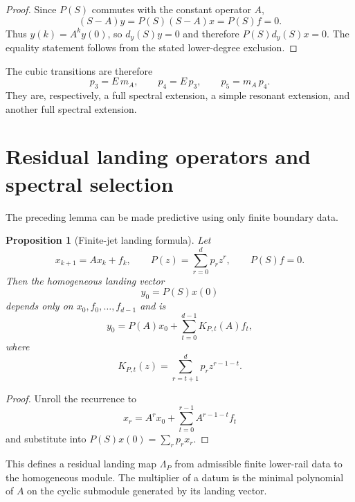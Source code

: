 \documentclass[11pt]{amsart}
\newtheorem{proposition}[theorem]{Proposition}
\begin{document}
\begin{proof}
Since $P(S)$ commutes with the constant operator $A$,
\[
(S-A)y=P(S)(S-A)x=P(S)f=0.
\]
Thus $y(k)=A^ky(0)$, so $d_y(S)y=0$ and therefore $P(S)d_y(S)x=0$.  The equality statement follows from the stated lower-degree exclusion.
\end{proof}

The cubic transitions are therefore
\[
\boxed{
p_3=E\,m_A,
\qquad
p_4=E\,p_3,
\qquad
p_5=m_A\,p_4.
}
\]
They are, respectively, a full spectral extension, a simple resonant extension, and another full spectral extension.

\section{Residual landing operators and spectral selection}\label{sec:landing}

The preceding lemma can be made predictive using only finite boundary data.

\begin{proposition}[Finite-jet landing formula]\label{prop:finite-jet-landing}
Let
\[
x_{k+1}=Ax_k+f_k,
\qquad
P(z)=\sum_{r=0}^dp_rz^r,
\qquad
P(S)f=0.
\]
Then the homogeneous landing vector
\[
y_0=P(S)x(0)
\]
depends only on $x_0,f_0,\ldots,f_{d-1}$ and is
\[
\boxed{
y_0=P(A)x_0+\sum_{t=0}^{d-1}K_{P,t}(A)f_t,
}
\]
where
\[
K_{P,t}(z)=\sum_{r=t+1}^dp_rz^{r-1-t}.
\]
\end{proposition}

\begin{proof}
Unroll the recurrence to
\[
x_r=A^rx_0+\sum_{t=0}^{r-1}A^{r-1-t}f_t
\]
and substitute into $P(S)x(0)=\sum_rp_rx_r$.
\end{proof}

This defines a residual landing map $\Lambda_P$ from admissible finite lower-rail data to the homogeneous module.  The multiplier of a datum is the minimal polynomial of $A$ on the cyclic submodule generated by its landing vector.
\end{document}
